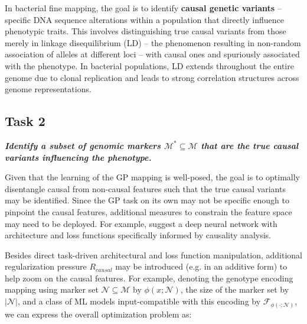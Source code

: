 \documentclass[12pt]{article}
\begin{document}
In bacterial fine mapping, the goal is to identify \textbf{causal genetic variants} -- specific DNA sequence alterations within a population that directly influence phenotypic traits. This involves distinguishing true causal variants from those merely in linkage disequilibrium (LD) -- the phenomenon resulting in non-random association of alleles at different loci -- with causal ones and spuriously associated with the phenotype. In bacterial populations, LD extends throughout the entire genome due to clonal replication and leads to strong correlation structures across genome representations.


\subsection{Task 2}\label{sec:task2}

\textbf{\textit{Identify a subset of genomic markers $\mathcal{M}^* \subseteq \mathcal{M}$ that are the true causal variants influencing the phenotype.}}

Given that the learning of the GP mapping is well-posed, the goal is to optimally disentangle causal from non-causal features such that the true causal variants may be identified. Since the GP task on its own may not be specific enough to pinpoint the causal features, additional measures to constrain the feature space may need to be deployed. For example, \cite{aliee2023conditionally} suggest a deep neural network with architecture and loss functions specifically informed by causality analysis.

Besides direct task-driven architectural  and loss function manipulation, additional regularization pressure $R_{causal}$ may be introduced (e.g. in an additive form) to help zoom on the causal features. For example, denoting the genotype encoding mapping using marker set
$\mathcal{N} \subseteq \mathcal{M}$ by $\phi(x; \mathcal{N})$, the size of the marker set by $\vert \mathcal{N}\vert$, and a class of ML models input-compatible with this encoding by 
$\mathcal{F}_{\phi(\cdot; \mathcal{N})}$, we can express the overall optimization problem as:


\end{document}
